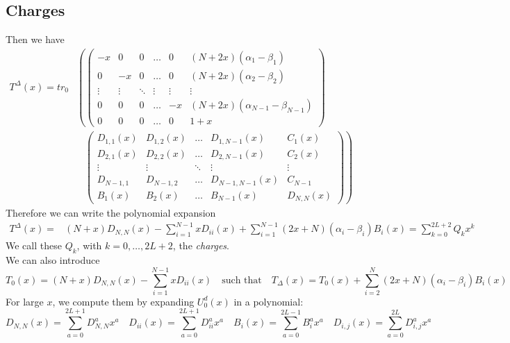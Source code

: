 \documentclass[10pt]{article}
\numberwithin{equation}{section}
\numberwithin{equation}{subsection}
\begin{document}
\subsection{Charges}
Then we have
\begin{equation}
	\begin{split}
		T^{\Delta}(x)=tr_{0}&\left(\begin{pmatrix}
			-x&0&0&\ldots&0&(N+2x)(\alpha_{1}-\beta_{1})\\
			0&-x&0&\ldots&0&(N+2x)(\alpha_{2}-\beta_{2})\\
			\vdots&\vdots&\ddots&\vdots&\vdots&\vdots\\
			0&0&0&\ldots&-x&(N+2x)(\alpha_{N-1}-\beta_{N-1})\\
			0&0&0&\ldots&0&1+x
		\end{pmatrix}\right.
		\\& \left.
		\;\;\;\begin{pmatrix}
			D_{1,1}(x)&D_{1,2}(x)&\ldots&D_{1,N-1}(x)&C_{1}(x)\\
			D_{2,1}(x)&D_{2,2}(x)&\ldots&D_{2,N-1}(x)&C_{2}(x)\\
			\vdots&\vdots&\ddots&\vdots&\vdots\\
			D_{N-1,1}&D_{N-1,2}&\ldots&D_{N-1,N-1}(x)&C_{N-1}\\
			B_{1}(x)&B_{2}(x)&\ldots&B_{N-1}(x)&D_{N,N}(x)
		\end{pmatrix}\right)
	\end{split}
\end{equation}
Therefore we can write the polynomial expansion
\begin{equation}
	\begin{split}
		T^{\Delta}(x)=&
		(N+x)D_{N,N}(x)-\sum_{i=1}^{N-1}xD_{ii}(x)+\sum_{i=1}^{N-1}(2x+N)(\alpha_{i}-\beta_{i})B_{i}(x)=
		\sum_{k=0}^{2L+2}Q_{k}x^{k}
	\end{split}
\end{equation}
We call these $Q_{k}$, with $k=0,\ldots,2L+2$, the \textit{charges}. \\
We can also introduce 
\begin{equation}
	T_{0}(x)=(N+x)D_{N,N}(x)-\sum_{i=1}^{N-1}xD_{ii}(x)\quad\text{such that}\quad T_{\Delta}(x)=T_{0}(x)+\sum_{i=2}^{N}(2x+N)(\alpha_{i}-\beta_{i})B_{i}(x)
\end{equation}For large $x$, we compute them by expanding $U_{0}^{d}(x)$ in a polynomial: 
\begin{equation}
	D_{N,N}(x)=\sum_{a=0}^{2L+1}D_{N,N}^{a}x^{a}\quad D_{ii}(x)=\sum_{a=0}^{2L+1}D_{ii}^{a}x^{a}\quad B_{i}(x)=\sum_{a=0}^{2L-1}B_{i}^{a}x^{a}\quad D_{i,j}(x)=\sum_{a=0}^{2L}D_{i,j}^{a}x^{a}
\end{equation}
\end{document}
